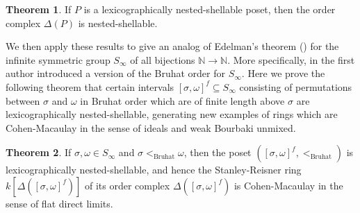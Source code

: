 \documentclass[oneside,11pt,reqno]{amsart}
\newcommand{\nn}{\ensuremath{\mathbb{N}}}
\theoremstyle{definition}
\newtheorem{proof techniques}{Proof Techniques}
\newtheorem{lettertheorem}{Theorem}
\begin{document}
\begin{lettertheorem}\label{thm: main thm nested-lex implies nested}
    If $P$ is a lexicographically nested-shellable poset, then the order complex $\Delta(P)$ is nested-shellable. 
\end{lettertheorem}

We then apply these results to give an analog of Edelman's theorem (\cite{edelman1981bruhat}) for the infinite symmetric group $S_\infty$ of all bijections $\nn \to \nn$. More specifically, in \cite{gallup2021well} the first author introduced a version of the Bruhat order for $S_\infty$. Here we prove the following theorem that certain intervals $[\sigma , \omega]^f \subseteq S_\infty$ consisting of permutations between $\sigma$ and $\omega$ in Bruhat order which are of finite length above $\sigma$ are lexicographically nested-shellable, generating new examples of rings which are Cohen-Macaulay in the sense of ideals and weak Bourbaki unmixed. 

\begin{lettertheorem}\label{thm: main thm Bruhat order}
If $\sigma , \omega \in S_\infty$ and $\sigma <_\text{Bruhat} \omega$, then the poset $([\sigma , \omega]^f , <_\text{Bruhat})$ is lexicographically nested-shellable, and hence the Stanley-Reisner ring $k[\Delta([\sigma , \omega]^f)]$ of its order complex $\Delta([\sigma , \omega]^f)$ is Cohen-Macaulay in the sense of flat direct limits. 
\end{lettertheorem}
\end{document}

